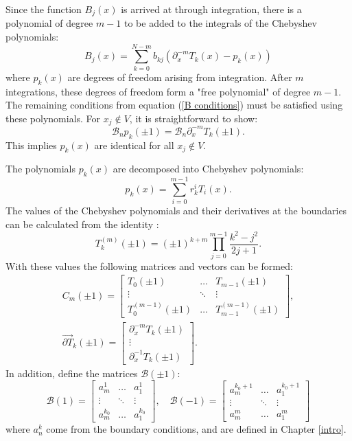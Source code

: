 \documentclass{sfuthesis}
\begin{document}
Since the function $B_j(x)$ is arrived at through integration, there is a polynomial of degree $m-1$ to be added to the integrals of the Chebyshev polynomials:
\begin{equation}
B_j(x) = \sum_{k=0}^{N-m} b_{kj} \left ( \partial_x^{-m} T_k(x) - p_{k}(x) \right )
\end{equation}
where $p_{k}(x)$ are degrees of freedom arising from integration.
After $m$ integrations, these degrees of freedom form a "free polynomial" of degree $m-1$.
The remaining conditions from equation (\ref{B conditions}) must be satisfied using these polynomials.
For $x_j \notin V$, it is straightforward to show:
\begin{equation}
\mathcal{B}_n p_{k}(\pm 1) = \mathcal{B}_n \partial_x^{-m} T_k(\pm 1) .
\end{equation}
This implies $p_{k}(x)$ are identical for all $x_j \notin V$.

The polynomials $p_{k}(x)$ are decomposed into Chebyshev polynomials:
\begin{equation} \label{poly decomp}
p_{k}(x) = \sum_{i=0}^{m-1} r_{k}^i T_i(x) .
\end{equation}
The values of the Chebyshev polynomials and their derivatives at the boundaries can be calculated from the identity \cite{peyret2002spectral}:
\begin{equation}
T^{(m)}_k (\pm 1) = (\pm 1)^{k+m} \prod_{j=0}^{m-1} \frac{k^2 - j^2}{2j + 1} .
\end{equation}
With these values the following matrices and vectors can be formed:
\begin{equation}
\begin{gathered}
C_m (\pm 1) = \begin{bmatrix} T_0(\pm 1) & \dots & T_{m-1}(\pm 1) \\ \vdots & \ddots & \vdots \\ T_0^{(m-1)}(\pm 1) & \dots & T_{m-1}^{(m-1)}(\pm 1) \end{bmatrix}, \\
\vec{\partial T}_k(\pm 1) = \begin{bmatrix} \partial_x^{-m} T_k(\pm 1) \\ \vdots \\ \partial_x^{-1} T_k(\pm 1) \end{bmatrix}.
\end{gathered}
\end{equation}
In addition, define the matrices $\mathcal{B}(\pm 1)$:
\begin{equation}
\mathcal{B}(1) = \begin{bmatrix} a_m^1 & \dots & a_1^1 \\ \vdots & \ddots & \vdots \\ a_m^{k_0} & \dots & a_1^{k_0} \end{bmatrix}, \quad
\mathcal{B}(-1) = \begin{bmatrix} a_m^{k_0+1} & \dots & a_1^{k_0+1} \\ \vdots & \ddots & \vdots \\ a_m^m & \dots & a_1^m \end{bmatrix}
\end{equation}
where $a_n^k$ come from the boundary conditions, and are defined in Chapter \ref{intro}.
\end{document}
